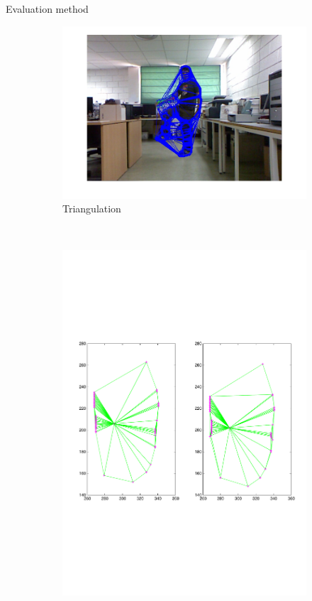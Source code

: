 \begin{frame}{Evaluation method}
\begin{itemize}
{\begin{figure}
\begin{subfigure}[b]{0.3\textwidth}
                \includegraphics[width=\textwidth, trim=0 0 0 0,clip]{fig21.jpg}
                \caption*{Triangulation}
        \end{subfigure}%
	 ~
        \begin{subfigure}[b]{0.3\textwidth}
                \centering
                \includegraphics[width=\textwidth, trim=40 230 30 220,clip]{fig22.pdf}

\end{subfigure}
\end{figure}}
\end{itemize}
\end{frame}
